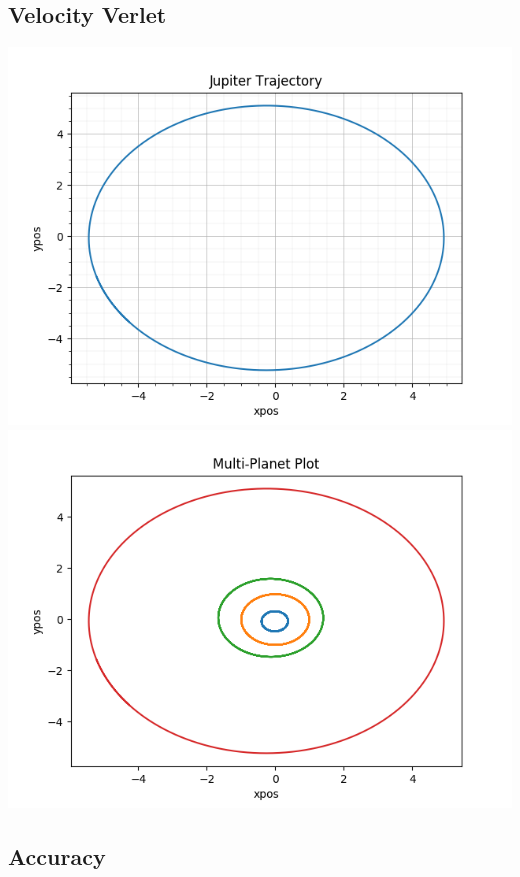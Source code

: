 \documentclass[12pt]{article}
\begin{document}
\subsection{Velocity Verlet}
\includegraphics[scale=0.5]{verlet_jupiter.png}
\includegraphics[scale=0.5]{verlet_multiplanet.png}

\subsection{Accuracy}
\end{document}
